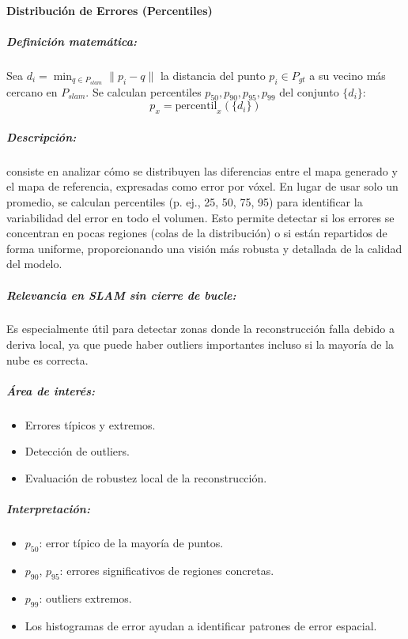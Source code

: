 \documentclass[12pt, a4paper, twoside]{article}
\begin{document}
\paragraph{Distribución de Errores (Percentiles)}

\subparagraph{Definición matemática:}
Sea $d_i = \min_{q \in P_{slam}} \|p_i - q\|$ la distancia del punto $p_i \in P_{gt}$ a su vecino más cercano en $P_{slam}$.  
Se calculan percentiles $p_{50}, p_{90}, p_{95}, p_{99}$ del conjunto $\{d_i\}$:
\[
p_x = \text{percentil}_x(\{ d_i \})
\]

\subparagraph{Descripción:}
consiste en analizar cómo se distribuyen las diferencias entre el mapa generado y el mapa de referencia, expresadas como error por vóxel.
 En lugar de usar solo un promedio, se calculan percentiles (p. ej., 25, 50, 75, 95) para identificar la variabilidad del error en todo el 
 volumen. Esto permite detectar si los errores se concentran en pocas regiones (colas de la distribución) o si están repartidos de forma 
 uniforme, proporcionando una visión más robusta y detallada de la calidad del modelo.

\subparagraph{Relevancia en SLAM\cite{smith1987slam} sin cierre de bucle:}
Es especialmente útil para detectar zonas donde la reconstrucción falla debido a deriva local, ya que puede haber outliers 
importantes incluso si la mayoría de la nube es correcta.
\subparagraph{Área de interés:}
\begin{itemize}
  \item Errores típicos y extremos.
  \item Detección de outliers.
  \item Evaluación de robustez local de la reconstrucción.
\end{itemize}

\subparagraph{Interpretación:}
\begin{itemize}
  \item $p_{50}$: error típico de la mayoría de puntos.  
  \item $p_{90}$, $p_{95}$: errores significativos de regiones concretas.  
  \item $p_{99}$: outliers extremos.  
  \item Los histogramas de error ayudan a identificar patrones de error espacial.
\end{itemize}
\end{document}
